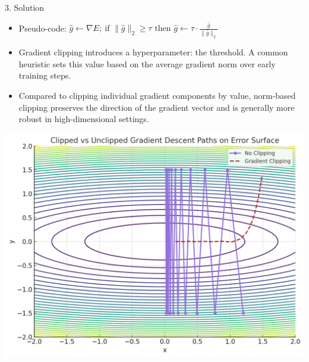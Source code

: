 \begin{frame}[t]
\begin{columns}[t,totalwidth=\textwidth]
\begin{column}{0.3\textwidth}
\begin{block}{3. Solution }
        \begin{minipage}{0.54\textwidth}
        \begin{itemize}
          \item Pseudo-code: $\hat{g} \leftarrow \nabla E;\ \text{if } \|\hat{g}\|_2 \geq \tau \text{ then } \hat{g} \leftarrow \tau \cdot \frac{\hat{g}}{\|\hat{g}\|_2}$
          \item Gradient clipping introduces a hyperparameter: the threshold. A common heuristic sets this value based on the average gradient norm over early training steps.
          \item Compared to clipping individual gradient components by value, norm-based clipping preserves the direction of the gradient vector and is generally more robust in high-dimensional settings.
        \end{itemize}
        \end{minipage}
        \hfill
        \begin{minipage}{0.42\textwidth}
        \centering
        \vspace{1em} %
        \includegraphics[width=\linewidth]{figures/gradient_clipping.png}
        \\[-0.3em]
        \end{minipage}


\end{block}
\end{column}
\end{columns}
\end{frame}
